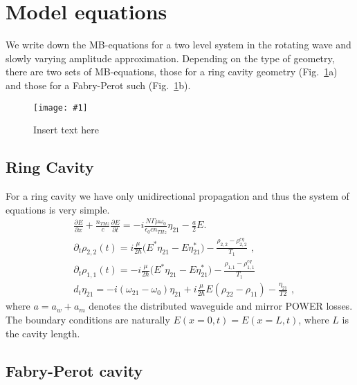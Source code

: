 \documentclass[preprint,secnumarabic,amssymb, nobibnotes, aip, prd]{revtex4-1}
\def\p{\partial}
\newcommand{\includegraphicsXL}[1]{\texttt{[image: \#1]}}
\begin{document}
\section{Model equations}
We write down the MB-equations for a two level system in the rotating wave and slowly varying amplitude approximation. Depending on the type of geometry, there are two sets of MB-equations, those for a ring cavity geometry (Fig.~\ref{fig:fig1}a) and those for a Fabry-Perot such (Fig.~\ref{fig:fig1}b).  

\begin{figure}
	\includegraphicsXL{IMGS/CAVITIES}
	\caption{Insert text here}
	\label{fig:fig1}
\end{figure}

\subsection{Ring Cavity}
For a ring cavity we have only unidirectional propagation and thus the system of equations is very simple.  
\begin{align}
& \frac{\p E}{\p x}+ \frac{n_{THz}}{c} \frac{\p E}{\p t} = -i\frac{N\Gamma\mu\omega_0}{\epsilon_0 c n_{THz}}\eta_{21}-\frac{a}{2}E.
\\
& \partial_t {\rho_{2,2}(t)} = i\frac{ \mu }{2 \hbar} \Big ( E^* \eta_{21} - E\eta_{21}^* \Big) -\frac{\rho_{2,2}-\rho_{2,2}^{eq}}{T_1}\text{  ,} \label{eq:inversion1}
\\
& \partial_t {\rho_{1,1}(t)} = - i\frac{ \mu }{2 \hbar} \Big ( E^* \eta_{21} - E\eta_{21}^* \Big) -\frac{\rho_{1,1}-\rho_{1,1}^{eq}}{T_1} \label{eq:inversion2}
\\
& d_t \eta_{21} = -i(\omega_{21}-\omega_0)\eta_{21}+i\frac{ \mu}{ 2 \hbar} E(\rho_{22}-\rho_{11}) - \frac{\eta_{21}}{T2} \text{  ,}
\end{align}
where $a = a_w+a_m$ denotes the distributed waveguide and mirror POWER losses. The boundary conditions are naturally $E(x=0,t)=E(x=L,t)$, where $L$ is the cavity length.

\subsection{Fabry-Perot cavity}
\end{document}
